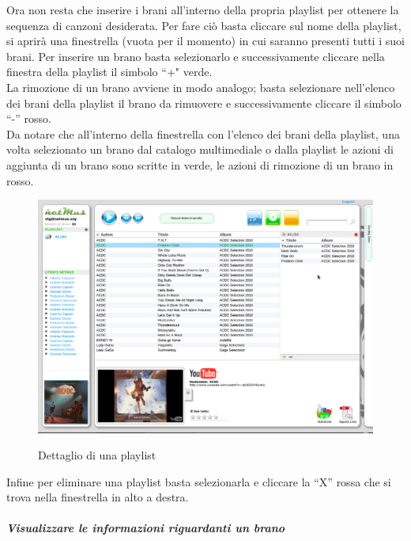 Ora non resta che inserire i brani all'interno della propria playlist
per ottenere la sequenza di canzoni desiderata. Per fare ci\`o basta cliccare sul
nome della playlist, si aprir\`a una finestrella (vuota per il momento) in cui
saranno presenti tutti i suoi brani. Per inserire un brano basta
selezionarlo e successivamente cliccare nella finestra della playlist il
simbolo ``+" verde.\\
La rimozione di un brano avviene in modo analogo; basta selezionare
nell'elenco dei brani della playlist il brano da rimuovere e successivamente
cliccare il simbolo ``-'' rosso.\\
Da notare che all'interno della finestrella con l'elenco dei brani della
playlist, una volta selezionato un brano dal catalogo multimediale o dalla
playlist le azioni di aggiunta di un brano sono scritte in verde, le azioni di
rimozione di un brano in rosso.\\
\begin{figure}[htbp]
  \centering
  \includegraphics[width=15cm]{img/MU/playlist_song.png}\\
\caption{Dettaglio di una playlist}
\end{figure}

Infine per eliminare una playlist basta selezionarla e cliccare la ``X'' rossa che
si trova nella finestrella in alto a destra.

\subparagraph{Visualizzare le informazioni riguardanti un brano}


